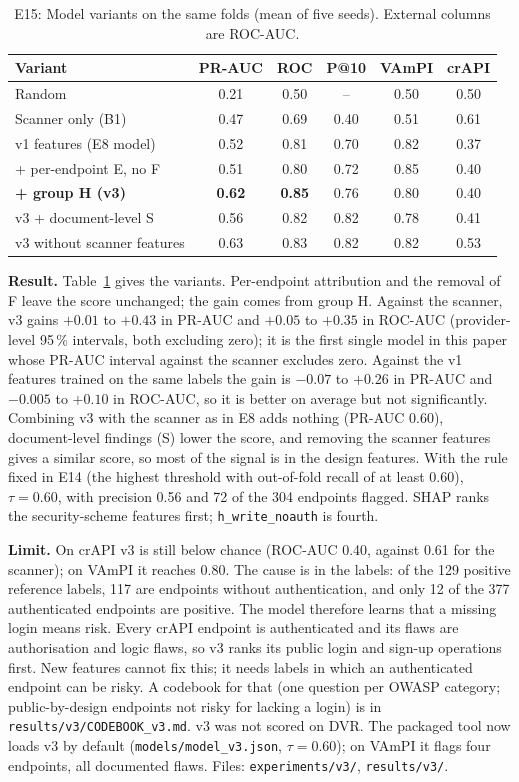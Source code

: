 \documentclass[conference]{IEEEtran}
\begin{document}
\begin{table}[!t]
\caption{E15: Model variants on the same folds (mean of five seeds). External columns are ROC-AUC.}
\label{tab:e15}
\centering
\scriptsize
\begin{tabular}{lccccc}
\toprule
\textbf{Variant} & \textbf{PR-AUC} & \textbf{ROC} & \textbf{P@10} & \textbf{VAmPI} & \textbf{crAPI}\\
\midrule
Random & 0.21 & 0.50 & -- & 0.50 & 0.50\\
Scanner only (B1) & 0.47 & 0.69 & 0.40 & 0.51 & 0.61\\
v1 features (E8 model) & 0.52 & 0.81 & 0.70 & 0.82 & 0.37\\
+ per-endpoint E, no F & 0.51 & 0.80 & 0.72 & 0.85 & 0.40\\
\textbf{+ group H (v3)} & \textbf{0.62} & \textbf{0.85} & 0.76 & 0.80 & 0.40\\
v3 + document-level S & 0.56 & 0.82 & 0.82 & 0.78 & 0.41\\
v3 without scanner features & 0.63 & 0.83 & 0.82 & 0.82 & 0.53\\
\bottomrule
\end{tabular}
\end{table}

\textbf{Result.} Table~\ref{tab:e15} gives the variants. Per-endpoint attribution and the removal of F leave the score unchanged; the gain comes from group H. Against the scanner, v3 gains $+0.01$ to $+0.43$ in PR-AUC and $+0.05$ to $+0.35$ in ROC-AUC (provider-level 95\,\% intervals, both excluding zero); it is the first single model in this paper whose PR-AUC interval against the scanner excludes zero. Against the v1 features trained on the same labels the gain is $-0.07$ to $+0.26$ in PR-AUC and $-0.005$ to $+0.10$ in ROC-AUC, so it is better on average but not significantly. Combining v3 with the scanner as in E8 adds nothing (PR-AUC 0.60), document-level findings (S) lower the score, and removing the scanner features gives a similar score, so most of the signal is in the design features. With the rule fixed in E14 (the highest threshold with out-of-fold recall of at least 0.60), $\tau=0.60$, with precision 0.56 and 72 of the 304 endpoints flagged. SHAP ranks the security-scheme features first; \texttt{h\_write\_noauth} is fourth.

\textbf{Limit.} On crAPI v3 is still below chance (ROC-AUC 0.40, against 0.61 for the scanner); on VAmPI it reaches 0.80. The cause is in the labels: of the 129 positive reference labels, 117 are endpoints without authentication, and only 12 of the 377 authenticated endpoints are positive. The model therefore learns that a missing login means risk. Every crAPI endpoint is authenticated and its flaws are authorisation and logic flaws, so v3 ranks its public login and sign-up operations first. New features cannot fix this; it needs labels in which an authenticated endpoint can be risky. A codebook for that (one question per OWASP category; public-by-design endpoints not risky for lacking a login) is in \texttt{results/v3/CODEBOOK\_v3.md}. v3 was not scored on DVR. The packaged tool now loads v3 by default (\texttt{models/model\_v3.json}, $\tau=0.60$); on VAmPI it flags four endpoints, all documented flaws. Files: \texttt{experiments/v3/}, \texttt{results/v3/}.
\end{document}

